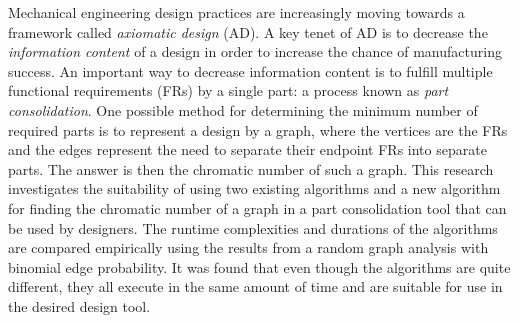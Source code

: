 Mechanical engineering design practices are increasingly moving towards a framework called \emph{axiomatic design}
(AD).  A key tenet of AD is to decrease the \emph{information content} of a design in order to increase the chance
of manufacturing success.  An important way to decrease information content is to fulfill multiple functional
requirements (FRs) by a single part: a process known as \emph{part consolidation}.  One possible method for
determining the minimum number of required parts is to represent a design by a graph, where the vertices are the
FRs and the edges represent the need to separate their endpoint FRs into separate parts.  The answer is then the
chromatic number of such a graph.  This research investigates the suitability of using two existing algorithms and
a new algorithm for finding the chromatic number of a graph in a part consolidation tool that can be used by
designers.  The runtime complexities and durations of the algorithms are compared empirically using the results
from a random graph analysis with binomial edge probability.  It was found that even though the algorithms are
quite different, they all execute in the same amount of time and are suitable for use in the desired design tool.
